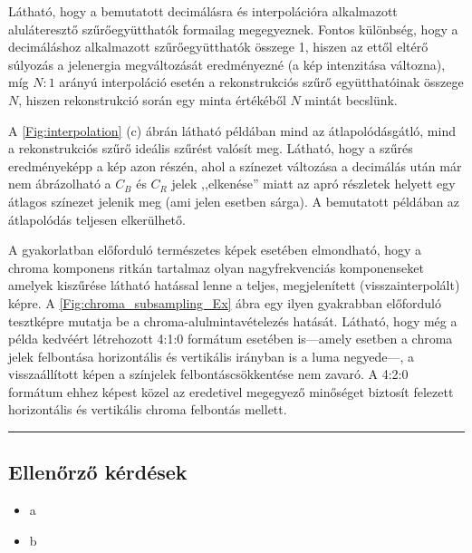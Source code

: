 Látható, hogy a bemutatott decimálásra és interpolációra alkalmazott aluláteresztő szűrőegyütthatók formailag megegyeznek.
Fontos különbség, hogy a decimáláshoz alkalmazott szűrőegyütthatók összege 1, hiszen az ettől eltérő súlyozás a jelenergia megváltozását eredményezné (a kép intenzitása változna), míg $N:1$ arányú interpoláció esetén a rekonstrukciós szűrő együtthatóinak összege $N$, hiszen rekonstrukció során egy minta értékéből $N$ mintát becslünk.

A \ref{Fig:interpolation} (c) ábrán látható példában mind az átlapolódásgátló, mind a rekonstrukciós szűrő ideális szűrést valósít meg.
Látható, hogy a szűrés eredményeképp a kép azon részén, ahol a színezet változása a decimálás után már nem ábrázolható a $C_B$ és $C_R$ jelek ,,elkenése'' miatt az apró részletek helyett egy átlagos színezet jelenik meg (ami jelen esetben sárga).
A bemutatott példában az átlapolódás teljesen elkerülhető.

\vspace{3mm}
A gyakorlatban előforduló természetes képek esetében elmondható, hogy a chroma komponens ritkán tartalmaz olyan nagyfrekvenciás komponenseket amelyek kiszűrése látható hatással lenne a teljes, megjelenített (visszainterpolált) képre.
A \ref{Fig:chroma_subsampling_Ex} ábra egy ilyen gyakrabban előforduló tesztképre mutatja be a chroma-alulmintavételezés hatását.
Látható, hogy még a példa kedvéért létrehozott 4:1:0 formátum esetében is---amely esetben a chroma jelek felbontása horizontális és vertikális irányban is a luma negyede---, a visszaállított képen a színjelek felbontáscsökkentése nem zavaró.
A 4:2:0 formátum ehhez képest közel az eredetivel megegyező minőséget biztosít felezett horizontális és vertikális chroma felbontás mellett.

\vspace{2cm}
\noindent\rule{12cm}{0.4pt}

\subsection*{Ellenőrző kérdések}

\begin{itemize}
\item a
\item b
\end{itemize}